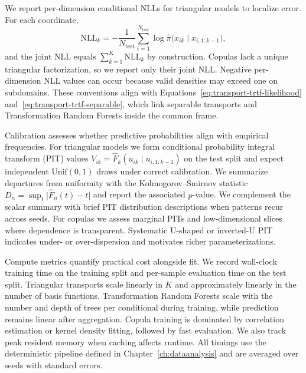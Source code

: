 \documentclass[11pt,a4paper,twoside]{book}\usepackage[]{graphicx}\usepackage[]{xcolor}
\begin{document}
We report per-dimension conditional NLLs for triangular models to localize error. For each coordinate,
\begin{equation}
  \mathrm{NLL}_k = -\frac{1}{N_{\mathrm{test}}} \sum_{i=1}^{N_{\mathrm{test}}} \log \hat{\pi}\big(x_{ik} \mid x_{i,1:k-1}\big),
  \label{eq:evaluation-conditional-nll}
\end{equation}
and the joint NLL equals $\sum_{k=1}^{K} \mathrm{NLL}_k$ by construction. Copulas lack a unique triangular factorization, so we report only their joint NLL. Negative per-dimension NLL values can occur because valid densities may exceed one on subdomains. These conventions align with Equations~\eqref{eq:transport-trtf-likelihood} and~\eqref{eq:transport-trtf-separable}, which link separable transports and Transformation Random Forests inside the common frame.

Calibration assesses whether predictive probabilities align with empirical frequencies. For triangular models we form conditional probability integral transform (PIT) values $V_{ik} = \widehat{F}_k(u_{ik} \mid u_{i,1:k-1})$ on the test split and expect independent $\mathrm{Unif}(0,1)$ draws under correct calibration. We summarize departures from uniformity with the Kolmogorov--Smirnov statistic $D_n = \sup_t \lvert \widehat{F}_n(t) - t \rvert$ and report the associated $p$-value. We complement the scalar summary with brief PIT distribution descriptions when patterns recur across seeds. For copulas we assess marginal PITs and low-dimensional slices where dependence is transparent. Systematic U-shaped or inverted-U PIT indicates under- or over-dispersion and motivates richer parameterizations.

Compute metrics quantify practical cost alongside fit. We record wall-clock training time on the training split and per-sample evaluation time on the test split. Triangular transports scale linearly in $K$ and approximately linearly in the number of basis functions. Transformation Random Forests scale with the number and depth of trees per conditional during training, while prediction remains linear after aggregation. Copula training is dominated by correlation estimation or kernel density fitting, followed by fast evaluation. We also track peak resident memory when caching affects runtime. All timings use the deterministic pipeline defined in Chapter~\ref{ch:dataanalysis} and are averaged over seeds with standard errors.
\end{document}
